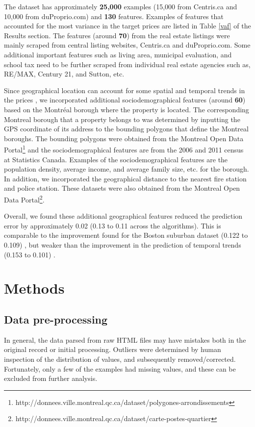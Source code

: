 \documentclass[conference]{IEEEtran}
\begin{document}
The dataset has approximately \textbf{25,000} examples (15,000 from Centris.ca and 10,000 from duProprio.com) and \textbf{130} features. Examples of features that accounted for the most variance in the target prices are listed in Table \ref{vaf} of the Results section. The features (around \textbf{70}) from the real estate listings were mainly scraped from central listing websites, Centris.ca and duProprio.com. Some additional important features such as living area, municipal evaluation, and school tax need to be further scraped from individual real estate agencies such as, RE/MAX, Century 21, and Sutton, etc.

Since geographical location can account for some spatial and temporal trends in the prices \cite{Caplin08machinelearning}, we incorporated additional sociodemographical features (around \textbf{60}) based on the Montr\'eal borough where the property is located. The corresponding Montreal borough that a property belongs to was determined by inputting the GPS coordinate of its address to the bounding polygons that define the Montreal boroughs. The bounding polygons were obtained from the Montreal Open Data Portal\footnote{http://donnees.ville.montreal.qc.ca/dataset/polygones-arrondissements} and the sociodemographical features are from the 2006 and 2011 census at Statistics Canada. Examples of the sociodemographical features are the population density, average income, and average family size, etc. for the borough. In addition, we incorporated the geographical distance to the nearest fire station and police station. These datasets were also obtained from the Montreal Open Data Portal\footnote{http://donnees.ville.montreal.qc.ca/dataset/carte-postes-quartier}.

Overall, we found these additional geographical features reduced the prediction error by approximately 0.02 (0.13 to 0.11 across the algorithms). This is comparable to the improvement found for the Boston suburban dataset (0.122 to 0.109) \cite{belkuhwel80}, but weaker than the improvement in the prediction of temporal trends (0.153 to 0.101) \cite{Caplin08machinelearning}. 

\section{Methods}
\subsection{Data pre-processing}
In general, the data parsed from raw HTML files may have mistakes both in the original record or initial processing. Outliers were determined by human inspection of the distribution of values, and subsequently removed/corrected. Fortunately, only a few of the examples had missing values, and these can be excluded from further analysis.
\end{document}
